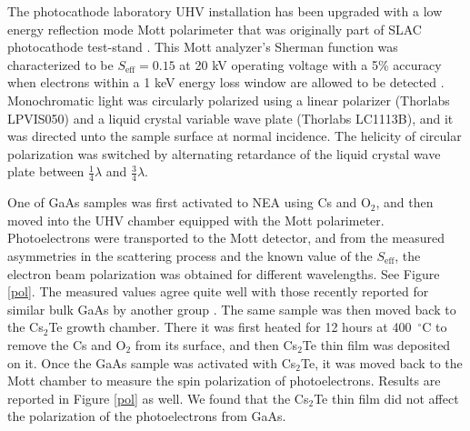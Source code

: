 The photocathode laboratory UHV installation has been upgraded with a low energy reflection mode Mott polarimeter that was originally part of SLAC photocathode test-stand \cite{alley1995_StanfordLinearAccelerator}. This Mott analyzer's Sherman function was characterized to be $S_\mathrm{eff}=0.15$ at 20 kV operating voltage with a 5\% accuracy when electrons within a 1 keV energy loss window are allowed to be detected \cite{Mulhollan_SLAC}.
Monochromatic light was circularly polarized using a linear polarizer (Thorlabs LPVIS050) and a liquid crystal variable wave plate (Thorlabs LC1113B), and it was directed unto the sample surface at normal incidence. The helicity of circular polarization was switched by alternating retardance of the liquid crystal wave plate between $\frac{1}{4}\lambda$ and $\frac{3}{4}\lambda$. %

One of GaAs samples was first activated to NEA using Cs and O$_2$, and then moved into the UHV chamber equipped with the Mott polarimeter. Photoelectrons were transported to the Mott detector, and from the measured asymmetries in the scattering process and the known value of the $S_\mathrm{eff}$, the electron beam polarization was obtained for different wavelengths. See Figure \ref{pol}. The measured values agree quite well with those recently reported for similar bulk GaAs by another group \cite{liu2017_ComprehensiveEvaluationFactors}. The same sample was then moved back to the Cs$_2$Te growth chamber. There it was first heated for 12 hours at 400~$^\circ$C to remove the Cs and O$_2$ from its surface, and then Cs$_2$Te thin film was deposited on it. Once the GaAs sample was activated with Cs$_2$Te, it was moved back to the Mott chamber to measure the spin polarization of photoelectrons. Results are reported in Figure \ref{pol} as well. We found that the Cs$_2$Te thin film did not affect the polarization of the photoelectrons from GaAs.


